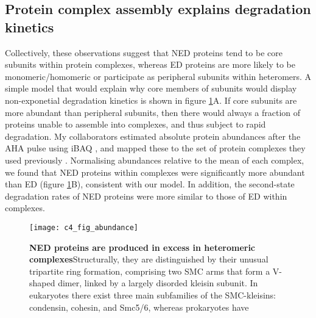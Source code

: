 \documentclass[a4paper,11pt,twoside,openright]{scrbook}
\begin{document}
\subsection{Protein complex assembly explains degradation kinetics}
Collectively, these observations suggest that NED proteins tend to be core subunits within protein complexes, whereas ED proteins are more likely to be monomeric/homomeric or participate as peripheral subunits within heteromers. A simple model that would explain why core members of subunits would display non-exponetial degradation kinetics is shown in figure \ref{figure:nedabundance}A. If core subunits are more abundant than peripheral subunits, then there would always a fraction of proteins unable to assemble into complexes, and thus subject to rapid degradation. My collaborators estimated absolute protein abundances after the AHA pulse using iBAQ \cite{Schwanhausser2011}, and mapped these to the set of protein complexes they used previously \cite{Ori2016}. Normalising abundances relative to the mean of each complex, we found that NED proteins within complexes were significantly more abundant than ED (figure \ref{figure:nedabundance}B), consistent with our model. In addition, the second-state degradation rates of NED proteins were more similar to those of ED within complexes.

\begin{figure}[h]
\fcapsideright
    {\caption[NED proteins are produced in excess in heteromeric complexes]{\sffamily\textbf{NED proteins are produced in excess in heteromeric complexes}\newline \small Structurally, they are distinguished by their unusual tripartite ring formation, comprising two SMC arms that form a V-shaped dimer, linked by a largely disorded kleisin subunit. In eukaryotes there exist three main subfamilies of the SMC-kleisins: condensin, cohesin, and Smc5/6, whereas prokaryotes have }\label{figure:nedabundance}}
    {\texttt{[image: c4\_fig\_abundance]}}
\end{figure}
\end{document}
